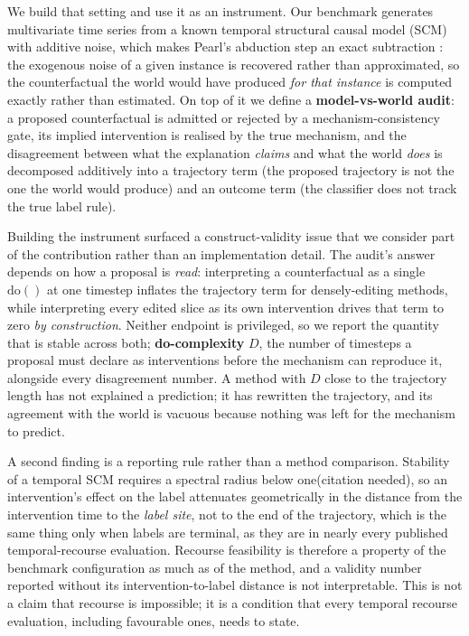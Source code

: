 \documentclass{article}
\newcommand{\dop}{\mathrm{do}}
\begin{document}
We build that setting and use it as an instrument. Our benchmark generates multivariate time series from a known temporal structural causal model (SCM) with additive noise, which makes Pearl's abduction step an exact subtraction \citep{pearl2009causality,hoyer2008anm}: the exogenous noise of a given instance is recovered rather than approximated, so the counterfactual the world would have produced \emph{for that instance} is computed exactly rather than estimated. On top of it we define a \textbf{model-vs-world audit}: a proposed counterfactual is admitted or rejected by a mechanism-consistency gate, its implied intervention is realised by the true mechanism, and the disagreement between what the explanation \emph{claims} and what the world \emph{does} is decomposed additively into a trajectory term (the proposed trajectory is not the one the world would produce) and an outcome term (the classifier does not track the true label rule).

Building the instrument surfaced a construct-validity issue that we consider part of the contribution rather than an implementation detail. The audit's answer depends on how a proposal is \emph{read}: interpreting a counterfactual as a single $\dop()$ at one timestep inflates the trajectory term for densely-editing methods, while interpreting every edited slice as its own intervention drives that term to zero \emph{by construction}. Neither endpoint is privileged, so we report the quantity that is stable across both; \textbf{do-complexity} $D$, the number of timesteps a proposal must declare as interventions before the mechanism can reproduce it, alongside every disagreement number. A method with $D$ close to the trajectory length has not explained a prediction; it has rewritten the trajectory, and its agreement with the world is vacuous because nothing was left for the mechanism to predict.

A second finding is a reporting rule rather than a method comparison. Stability of a temporal SCM requires a spectral radius below one(citation needed), so an intervention's effect on the label attenuates geometrically in the distance from the intervention time to the \emph{label site}, not to the end of the trajectory, which is the same thing only when labels are terminal, as they are in nearly every published temporal-recourse evaluation. Recourse feasibility is therefore a property of the benchmark configuration as much as of the method, and a validity number reported without its intervention-to-label distance is not interpretable. This is not a claim that recourse is impossible; it is a condition that every temporal recourse evaluation, including favourable ones,
needs to state.
\end{document}
